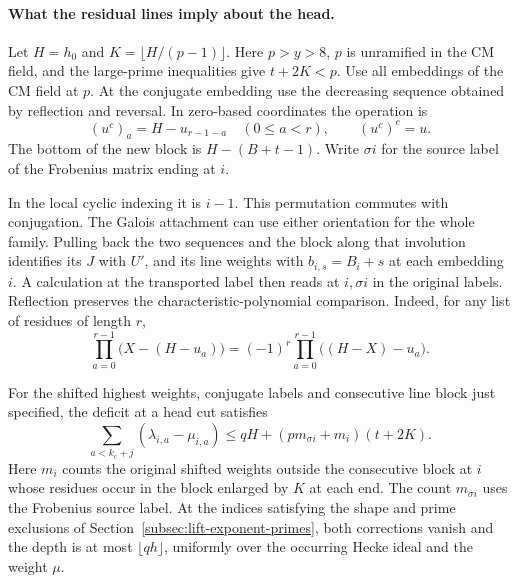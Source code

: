 \paragraph{What the residual lines imply about the head.}
\hypertarget{source-lift-weight-exchange}{}
Let \(H=h_0\) and \(K=\lfloor H/(p-1)\rfloor\).
Here \(p>y>8\), \(p\) is unramified in the CM field, and
the large-prime inequalities give \(t+2K<p\).
Use all embeddings of the CM field at \(p\). At the conjugate embedding use the decreasing sequence obtained by reflection and reversal. In zero-based coordinates the operation is
\[
 (u^c)_a=H-u_{r-1-a}\quad(0\le a<r),\qquad (u^c)^c=u .
\] The
bottom of the new block is \(H-(B+t-1)\). Write
\(\sigma i\) for the source label of the Frobenius matrix
ending at \(i\).

In the local cyclic indexing it is \(i-1\).
This permutation commutes with conjugation. The Galois attachment can use either
orientation for the whole family. Pulling back the two
sequences and the block along that involution identifies its
\(J\) with \(U'\), and its line weights with
\(b_{i,s}=B_i+s\) at each embedding \(i\). A calculation at
the transported label then reads at \(i,\sigma i\) in the
original labels. Reflection preserves the characteristic-polynomial comparison. Indeed, for any list of residues of length \(r\),
\[
 \prod_{a=0}^{r-1}\bigl(X-(H-u_a)\bigr)=(-1)^r\prod_{a=0}^{r-1}\bigl((H-X)-u_a\bigr).
\]

\begin{proposition}\label{prop:residual-head-depth}
For the shifted highest weights, conjugate labels and consecutive
line block just specified, the deficit at a head cut satisfies
\[
 \sum_{a<k_c+j}(\lambda_{i,a}-\mu_{i,a})
   \le qH+(p m_{\sigma i}+m_i)(t+2K).
\]
Here \(m_i\) counts the original shifted weights outside the consecutive
block at \(i\) whose residues occur in the block enlarged by \(K\)
at each end. The count \(m_{\sigma i}\) uses the Frobenius source label. At the indices satisfying the shape and
prime exclusions of Section~\ref{subsec:lift-exponent-primes},
both corrections vanish and the depth is at most \(\lfloor qh\rfloor\),
uniformly over the occurring Hecke ideal and the weight \(\mu\).
\end{proposition}

